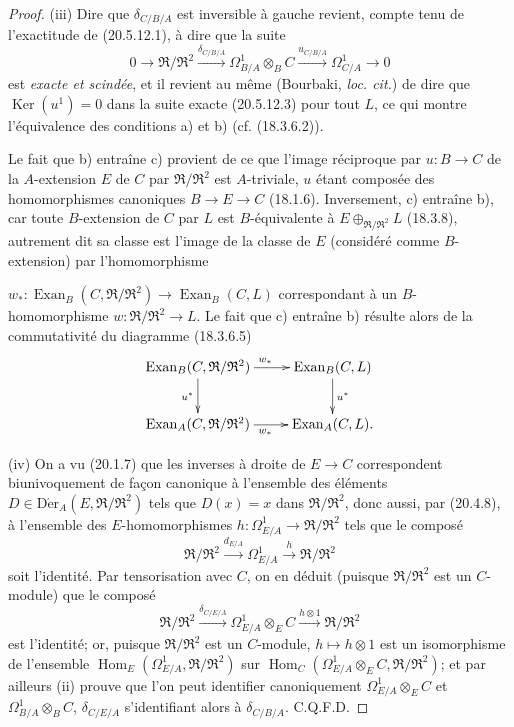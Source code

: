 \begin{proof}
\medskip
(iii) Dire que $\delta_{C/B/A}$ est inversible à gauche revient, compte
tenu de l'exactitude de (20.5.12.1), à dire que la suite
\begin{equation}
\tag{20.5.12.5}
\label{0.20.5.12.5-fr}
  0\longrightarrow\mathfrak{R}/\mathfrak{R}^2
  \xrightarrow{\delta_{C/B/A}}\Omega^1_{B/A}\otimes_B C
  \xrightarrow{u_{C/B/A}}\Omega^1_{C/A}\longrightarrow0
\end{equation}
est \emph{exacte et scindée}, et il revient au même (Bourbaki,
\emph{loc. cit.}) de dire que $\operatorname{Ker}(u^1)=0$ dans la suite exacte
(20.5.12.3) pour tout $L$, ce qui montre l'équivalence des conditions
a) et b) (cf. (18.3.6.2)).

Le fait que b) entraîne c) provient de ce que l'image réciproque par
$u:B\to C$ de la $A$-extension $E$ de $C$ par
$\mathfrak{R}/\mathfrak{R}^2$ est $A$-triviale, $u$ étant composée des
homomorphismes canoniques $B\to E\to C$ (18.1.6). Inversement, c)
entraîne b), car toute $B$-extension de $C$ par $L$ est $B$-équivalente
à $E\oplus_{\mathfrak{R}/\mathfrak{R}^2}L$ (18.3.8), autrement dit sa
classe est l'image de la classe de $E$ (considéré comme $B$-extension)
par l'homomorphisme

$w_*:\operatorname{Exan}_B(C,\mathfrak{R}/\mathfrak{R}^2)
\to\operatorname{Exan}_B(C,L)$ correspondant à un $B$-homomorphisme
$w:\mathfrak{R}/\mathfrak{R}^2\to L$. Le fait que c) entraîne b) résulte
alors de la commutativité du diagramme (18.3.6.5)
\[
\xymatrix{
  \operatorname{Exan}_B(C,\mathfrak{R}/\mathfrak{R}^2)
    \ar[r]^{w_*} \ar[d]_{u^*} &
  \operatorname{Exan}_B(C,L) \ar[d]^{u^*} \\
  \operatorname{Exan}_A(C,\mathfrak{R}/\mathfrak{R}^2)
    \ar[r]_{w_*} & \operatorname{Exan}_A(C,L).
}
\]

\medskip
(iv) On a vu (20.1.7) que les inverses à droite de $E\to C$
correspondent biunivoquement de façon canonique à l'ensemble des éléments
$D\in\operatorname{D\acute{e}r}_A(E,\mathfrak{R}/\mathfrak{R}^2)$ tels que $D(x)=x$ dans
$\mathfrak{R}/\mathfrak{R}^2$, donc aussi, par (20.4.8), à l'ensemble des
$E$-homomorphismes
$h:\Omega^1_{E/A}\to\mathfrak{R}/\mathfrak{R}^2$ tels que le composé
\[
  \mathfrak{R}/\mathfrak{R}^2\xrightarrow{d_{E/A}}
  \Omega^1_{E/A}\xrightarrow{h}\mathfrak{R}/\mathfrak{R}^2
\]
soit l'identité. Par tensorisation avec $C$, on en déduit (puisque
$\mathfrak{R}/\mathfrak{R}^2$ est un $C$-module) que le composé
\[
  \mathfrak{R}/\mathfrak{R}^2\xrightarrow{\delta_{C/E/A}}
  \Omega^1_{E/A}\otimes_E C\xrightarrow{h\otimes1}
  \mathfrak{R}/\mathfrak{R}^2
\]
est l'identité; or, puisque $\mathfrak{R}/\mathfrak{R}^2$ est un
$C$-module, $h\mapsto h\otimes1$ est un isomorphisme de l'ensemble
$\operatorname{Hom}_E(\Omega^1_{E/A},\mathfrak{R}/\mathfrak{R}^2)$ sur
$\operatorname{Hom}_C(\Omega^1_{E/A}\otimes_E C,\mathfrak{R}/\mathfrak{R}^2)$; et par
ailleurs (ii) prouve que l'on peut identifier canoniquement
$\Omega^1_{E/A}\otimes_E C$ et $\Omega^1_{B/A}\otimes_B C$,
$\delta_{C/E/A}$ s'identifiant alors à $\delta_{C/B/A}$. C.Q.F.D.
\end{proof}

